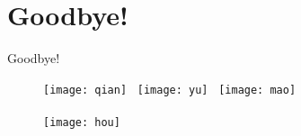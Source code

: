 \documentclass[10pt]{beamer}
\begin{document}
\section{Goodbye!}
\begin{frame}[allowframebreaks]{Goodbye!}
\begin{figure}[H]
	\centering
	\texttt{[image: qian]}~
	\texttt{[image: yu]}~
	\texttt{[image: mao]}\\~\\
	\texttt{[image: hou]}
\end{figure}
	
\end{frame}
\end{document}
